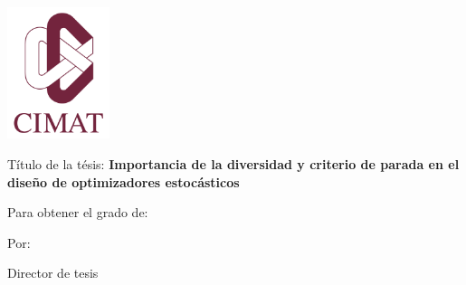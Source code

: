 
\begin{titlepage}

{\sffamily

\begin{center}

\includegraphics[width=30mm]{figures/logo}

\vfill\vfill\vfill
{\LARGE \mynamecimat}

\vfill\vfill\vfill

{\LARGE\bfseries\mytitle}
\vfill
Título de la tésis:
\vfill
{\large\bfseries Importancia de la diversidad y criterio de parada en el diseño de optimizadores estocásticos}

\vfill\vfill\vfill
Para obtener el grado de:

{\Large \bfseries \mydegreeprogramme}

\vfill\vfill\vfill
{\large Por:}

\myauthor

{\large Director de tesis}

\mysupervisor

{\small \mysupervisorinfo}


















\vfill\vfill\vfill

\mysubmissionmonth~\mysubmissionyear

\end{center}
}%
\end{titlepage}

